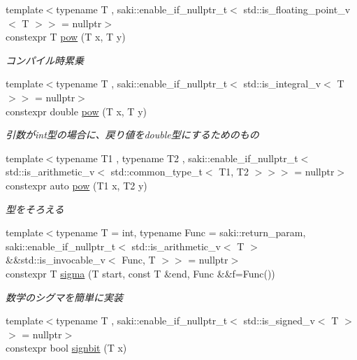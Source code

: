 \begin{DoxyCompactItemize}
{\footnotesize template$<$typename T , saki\+::enable\+\_\+if\+\_\+nullptr\+\_\+t$<$ std\+::is\+\_\+floating\+\_\+point\+\_\+v$<$ T $>$$>$  = nullptr$>$ }\\constexpr T \mbox{\hyperlink{namespacesaki_aa5b66f18d7c8c94b4c50731449ed3240}{pow}} (T x, T y)
\begin{DoxyCompactList}\small\item\em コンパイル時累乗 \end{DoxyCompactList}\item 
{\footnotesize template$<$typename T , saki\+::enable\+\_\+if\+\_\+nullptr\+\_\+t$<$ std\+::is\+\_\+integral\+\_\+v$<$ T $>$$>$  = nullptr$>$ }\\constexpr double \mbox{\hyperlink{namespacesaki_a53b0e93733e85d7c6ab17aea25072536}{pow}} (T x, T y)
\begin{DoxyCompactList}\small\item\em 引数がint型の場合に、戻り値をdouble型にするためのもの \end{DoxyCompactList}\item 
{\footnotesize template$<$typename T1 , typename T2 , saki\+::enable\+\_\+if\+\_\+nullptr\+\_\+t$<$ std\+::is\+\_\+arithmetic\+\_\+v$<$ std\+::common\+\_\+type\+\_\+t$<$ T1, T2 $>$$>$$>$  = nullptr$>$ }\\constexpr auto \mbox{\hyperlink{namespacesaki_a27bb8324ff45bceda3b301f9f3f417c7}{pow}} (T1 x, T2 y)
\begin{DoxyCompactList}\small\item\em 型をそろえる \end{DoxyCompactList}\item 
{\footnotesize template$<$typename T  = int, typename Func  = saki\+::return\+\_\+param, saki\+::enable\+\_\+if\+\_\+nullptr\+\_\+t$<$ std\+::is\+\_\+arithmetic\+\_\+v$<$ T $>$ \&\&std\+::is\+\_\+invocable\+\_\+v$<$ Func, T $>$$>$  = nullptr$>$ }\\constexpr T \mbox{\hyperlink{namespacesaki_ac51e06f83630682641e0d99d5c957a9c}{sigma}} (T start, const T \&end, Func \&\&f=Func())
\begin{DoxyCompactList}\small\item\em 数学のシグマを簡単に実装 \end{DoxyCompactList}\item 
{\footnotesize template$<$typename T , saki\+::enable\+\_\+if\+\_\+nullptr\+\_\+t$<$ std\+::is\+\_\+signed\+\_\+v$<$ T $>$$>$  = nullptr$>$ }\\constexpr bool \mbox{\hyperlink{namespacesaki_a230838749b1e19afc5f9265bd161d4d8}{signbit}} (T x)

\end{DoxyCompactItemize}
